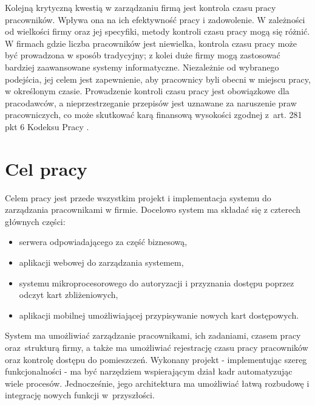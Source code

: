 Kolejną krytyczną kwestią w zarządzaniu firmą jest kontrola czasu pracy pracowników. Wpływa ona na ich efektywność pracy i zadowolenie. W zależności od wielkości firmy oraz jej specyfiki, metody kontroli czasu pracy mogą się różnić. W firmach gdzie liczba pracowników jest niewielka, kontrola czasu pracy może być prowadzona w sposób tradycyjny; z kolei duże firmy mogą zastosować bardziej zaawansowane systemy informatyczne. Niezależnie od wybranego podejścia, jej celem jest zapewnienie, aby pracownicy byli obecni w miejscu pracy, w określonym czasie. Prowadzenie kontroli czasu pracy jest obowiązkowe dla pracodawców, a nieprzestrzeganie przepisów jest uznawane za naruszenie praw pracowniczych, co może skutkować karą finansową wysokości zgodnej z~art. 281 pkt 6 Kodeksu Pracy \cite{bib:KodeksPracy}.

\section{Cel pracy}



Celem pracy jest przede wszystkim projekt i implementacja systemu do zarządzania pracownikami w firmie. Docelowo system ma składać się z czterech głównych części:

\begin{itemize}
    \item serwera odpowiadającego za część biznesową,
    \item aplikacji webowej do zarządzania systemem,
    \item systemu mikroprocesorowego do autoryzacji i przyznania dostępu poprzez odczyt kart zbliżeniowych,
    \item aplikacji mobilnej umożliwiającej przypisywanie nowych kart dostępowych.
\end{itemize}

System ma umożliwiać zarządzanie pracownikami, ich zadaniami, czasem pracy oraz~strukturą firmy, a także ma umożliwiać rejestrację czasu pracy pracowników oraz kontrolę dostępu do pomieszczeń. Wykonany projekt - implementując szereg funkcjonalności - ma być narzędziem wspierającym dział kadr automatyzując wiele procesów. Jednocześnie, jego architektura ma umożliwiać łatwą rozbudowę i integrację nowych funkcji w~przyszłości.

